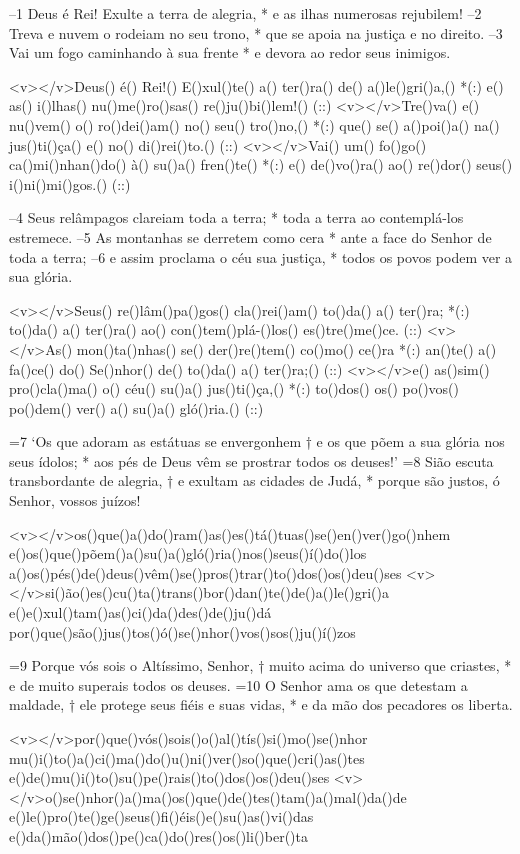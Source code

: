 –1 Deus é Rei! Exulte a terra de alegria, *
e as ilhas numerosas rejubilem!
–2 Treva e nuvem o rodeiam no seu trono, *
que se apoia na justiça e no direito.
–3 Vai um fogo caminhando à sua frente *
e devora ao redor seus inimigos.

<v></v>Deus() é() Rei!() E()xul()te() a() ter()ra() de() a()le()gri()a,() *(:)
e() as() i()lhas() nu()me()ro()sas() re()ju()bi()lem!() (::)
<v></v>Tre()va() e() nu()vem() o() ro()dei()am() no() seu() tro()no,() *(:)
que() se() a()poi()a() na() jus()ti()ça() e() no() di()rei()to.() (::)
<v></v>Vai() um() fo()go() ca()mi()nhan()do() à() su()a() fren()te() *(:)
e() de()vo()ra() ao() re()dor() seus() i()ni()mi()gos.() (::)

–4 Seus relâmpagos clareiam toda a terra; *
toda a terra ao contemplá-los estremece.
–5 As montanhas se derretem como cera *
ante a face do Senhor de toda a terra;
–6 e assim proclama o céu sua justiça, *
todos os povos podem ver a sua glória.

<v></v>Seus() re()lâm()pa()gos() cla()rei()am() to()da() a() ter()ra; *(:)
to()da() a() ter()ra() ao() con()tem()plá-()los() es()tre()me()ce. (::)
<v></v>As() mon()ta()nhas() se() der()re()tem() co()mo() ce()ra *(:)
an()te() a() fa()ce() do() Se()nhor() de() to()da() a() ter()ra;() (::)
<v></v>e() as()sim() pro()cla()ma() o() céu() su()a() jus()ti()ça,() *(:)
to()dos() os() po()vos() po()dem() ver() a() su()a() gló()ria.() (::)

=7 ‘Os que adoram as estátuas se envergonhem †
e os que põem a sua glória nos seus ídolos; *
aos pés de Deus vêm se prostrar todos os deuses!’
=8 Sião escuta transbordante de alegria, †
e exultam as cidades de Judá, *
porque são justos, ó Senhor, vossos juízos!

<v></v>os()que()a()do()ram()as()es()tá()tuas()se()en()ver()go()nhem
e()os()que()põem()a()su()a()gló()ria()nos()seus()í()do()los
a()os()pés()de()deus()vêm()se()pros()trar()to()dos()os()deu()ses
<v></v>si()ão()es()cu()ta()trans()bor()dan()te()de()a()le()gri()a
e()e()xul()tam()as()ci()da()des()de()ju()dá
por()que()são()jus()tos()ó()se()nhor()vos()sos()ju()í()zos

=9 Porque vós sois o Altíssimo, Senhor, †
muito acima do universo que criastes, *
e de muito superais todos os deuses.
=10 O Senhor ama os que detestam a maldade, †
ele protege seus fiéis e suas vidas, *
e da mão dos pecadores os liberta.

<v></v>por()que()vós()sois()o()al()tís()si()mo()se()nhor
mu()i()to()a()ci()ma()do()u()ni()ver()so()que()cri()as()tes
e()de()mu()i()to()su()pe()rais()to()dos()os()deu()ses
<v></v>o()se()nhor()a()ma()os()que()de()tes()tam()a()mal()da()de
e()le()pro()te()ge()seus()fi()éis()e()su()as()vi()das
e()da()mão()dos()pe()ca()do()res()os()li()ber()ta

